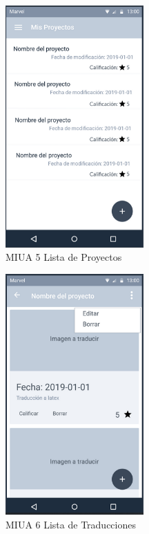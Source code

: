 \begin{figure}[h]
    \centering
    \includegraphics[width=200px]{capitulo4/imagenes/android/MIUA_5.png}
    \caption{MIUA 5 Lista de Proyectos}
    \label{fig:MIUA-5} %
\end{figure}
\newpage
\begin{figure}[H]
    \centering
    \includegraphics[width=200px]{capitulo4/imagenes/android/MIUA_6.png}
    \caption{MIUA 6 Lista de Traducciones}
    \label{fig:MIUA-6} %
\end{figure}
\newpage
